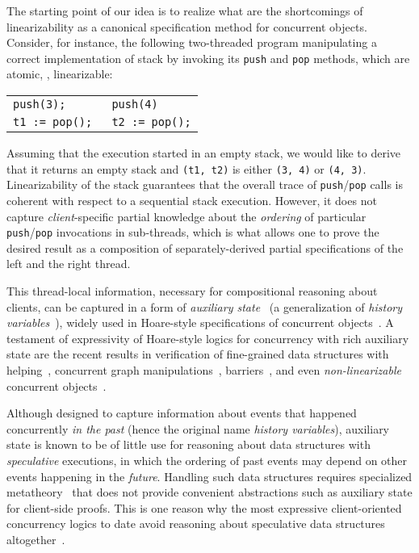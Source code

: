 The starting point of our idea is to realize what are the
shortcomings of linearizability as a canonical specification method
for concurrent objects.
%
Consider, for instance, the following two-threaded program manipulating
a correct implementation of stack by invoking its \texttt{push}
and \texttt{pop} methods, which are atomic, \ie, linearizable:
%
\begin{center}
\begin{tabular}{l || l}
\texttt{push(3);} & \texttt{push(4)}
\\
\texttt{t1 := pop(); } & \texttt{t2 := pop();}
\end{tabular} 
\end{center}
%
Assuming that the execution started in an empty stack, we would like
to derive that it returns an empty stack and \texttt{(t1, t2)} is
either \texttt{(3, 4)} or \texttt{(4, 3)}.
%
Linearizability of the stack guarantees that the overall trace of
\texttt{push}/\texttt{pop} calls is coherent with respect to a
sequential stack execution. However, it does not capture
\emph{client}-specific partial knowledge about the \emph{ordering} of
particular \texttt{push}/\texttt{pop} invocations in sub-threads,
which is what allows one to prove the desired result as a
composition of separately-derived partial specifications of the left and the right thread.

This thread-local information, necessary for compositional reasoning
about clients, can be captured in a form of \emph{auxiliary
  state}~\cite{OwickiG+CACM76} (a generalization of \emph{history
  variables}~\cite{AbadiL+lics88}), widely used in Hoare-style
specifications of concurrent
objects~\cite{SergeyNB+ESOP15,LeyWildN+POPL13,JungSSSTBD+POPL15,JungKBD+ICFP16}.
%
A testament of expressivity of Hoare-style logics for concurrency with
rich auxiliary state are the recent results in verification of
fine-grained data structures with helping~\cite{SergeyNB+ESOP15},
concurrent graph manipulations~\cite{SergeyNB+PLDI15},
barriers~\cite{JungKBD+ICFP16,DoddsJPSB+TOPLAS16}, and even
\emph{non-linearizable} concurrent objects~\cite{SergeyNBD+OOPSLA16}.

Although designed to capture information about events that happened
concurrently \emph{in the past} (hence the original name \emph{history
  variables}), auxiliary state is known to be of little use for
reasoning about data structures with \emph{speculative} executions, in
which the ordering of past events may depend on other events happening
in the \emph{future}. Handling such data structures requires
specialized metatheory~\cite{LiangF+PLDI13} that does not provide
convenient abstractions such as auxiliary state for client-side
proofs. This is one reason why the most expressive client-oriented
concurrency logics to date avoid reasoning about speculative data
structures altogether~\cite{JungKBD+ICFP16}.

